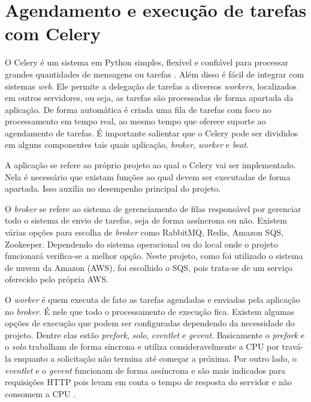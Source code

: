 \section{Agendamento e execução de tarefas com Celery}

\indent 
\par O Celery é um sistema em Python simples, flexível e confiável para processar grandes quantidades de mensagens ou tarefas \cite{Celery}. Além disso é fácil de integrar com sistemas \textit{web}. Ele permite a delegação de tarefas a diversos \textit{workers}, localizados em outros servidores, ou seja, as tarefas são processadas de forma apartada da aplicação. De forma automática é criada uma fila de tarefas com foco no processamento em tempo real, ao mesmo tempo que oferece suporte ao agendamento de tarefas. É importante salientar que o Celery pode ser divididos em alguns componentes tais quais aplicação, \textit{broker}, \textit{worker} e \textit{beat}.
\indent 
\par A aplicação se refere ao próprio projeto ao qual o Celery vai ser implementado. Nela é necessário que existam funções ao qual devem ser executadas de forma apartada. Isso auxilia no desempenho principal do projeto.
\indent 
\par O \textit{broker} se refere ao sistema de gerenciamento de filas responsável por gerenciar todo o sistema de envio de tarefas, seja de forma assíncrona ou não. Existem várias opções para escolha de \textit{broker} como RabbitMQ, Redis, Amazon SQS, Zookeeper. Dependendo do sistema operacional ou do local onde o projeto funcionará verifica-se a melhor opção. Neste projeto, como foi utilizado o sistema de nuvem da Amazon (AWS), foi escolhido o SQS, pois trata-se de um serviço oferecido pelo própria AWS.
\indent 
\par O \textit{worker} é quem executa de fato as tarefas agendadas e enviadas pela aplicação no \textit{broker}. É nele que todo o processamento de execução fica. Existem algumas opções de execução que podem ser configuradas dependendo da necessidade do projeto. Dentre elas estão \textit{prefork}, \textit{solo}, \textit{eventlet} e \textit{gevent}. Basicamente o \textit{prefork} e o \textit{solo} trabalham de forma síncrona e utiliza consideravelmente a CPU por travá-la enquanto a solicitação não termina até começar a próxima. Por outro lado, o \textit{eventlet} e o \textit{gevent} funcionam de forma assíncrona e são mais indicados para requisições HTTP pois levam em conta o tempo de resposta do servidor e não consomem a CPU \cite{CeleryEP}. 
